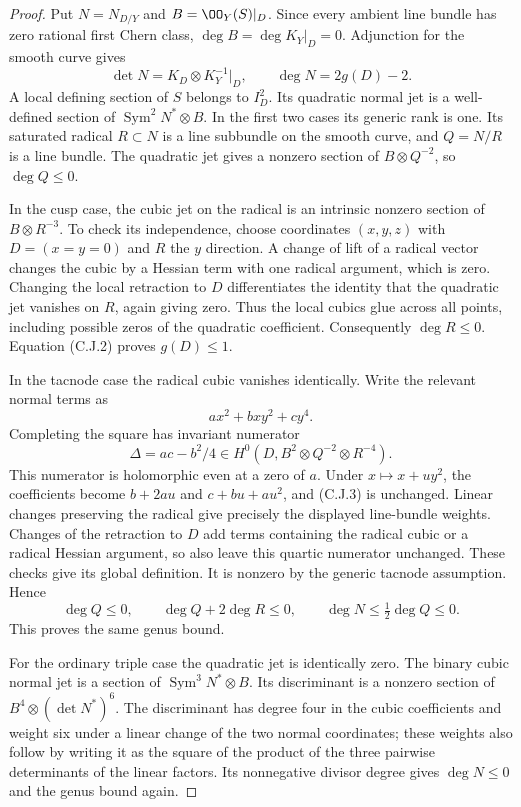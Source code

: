 \begin{proof}
Put $N=N_{D/Y}$ and $B=\OO_Y(S)|_D$. Since every ambient line bundle has zero rational first Chern class, $\deg B=\deg K_Y|_D=0$. Adjunction for the smooth curve gives
\[
 \det N=K_D\otimes K_Y^{-1}|_D,\qquad
 \deg N=2g(D)-2.                                      \tag{C.J.2}
\]
A local defining section of $S$ belongs to $I_D^2$. Its quadratic normal jet is a well-defined section of $\operatorname{Sym}^2N^*\otimes B$. In the first two cases its generic rank is one. Its saturated radical $R\subset N$ is a line subbundle on the smooth curve, and $Q=N/R$ is a line bundle. The quadratic jet gives a nonzero section of $B\otimes Q^{-2}$, so
$\deg Q\le0$.

In the cusp case, the cubic jet on the radical is an intrinsic nonzero section of $B\otimes R^{-3}$. To check its independence, choose coordinates $(x,y,z)$ with $D=(x=y=0)$ and $R$ the $y$ direction. A change of lift of a radical vector changes the cubic by a Hessian term with one radical argument, which is zero. Changing the local retraction to $D$ differentiates the identity that the quadratic jet vanishes on $R$, again giving zero. Thus the local cubics glue across all points, including possible zeros of the quadratic coefficient. Consequently $\deg R\le0$. Equation (C.J.2) proves $g(D)\le1$.

In the tacnode case the radical cubic vanishes identically. Write the relevant normal terms as
\[
 a x^2+bxy^2+cy^4.
\]
Completing the square has invariant numerator
\[
 \Delta=ac-b^2/4\in
 H^0(D,B^2\otimes Q^{-2}\otimes R^{-4}).               \tag{C.J.3}
\]
This numerator is holomorphic even at a zero of $a$. Under $x\mapsto x+uy^2$, the coefficients become $b+2au$ and $c+bu+au^2$, and (C.J.3) is unchanged. Linear changes preserving the radical give precisely the displayed line-bundle weights. Changes of the retraction to $D$ add terms containing the radical cubic or a radical Hessian argument, so also leave this quartic numerator unchanged. These checks give its global definition. It is nonzero by the generic tacnode assumption. Hence
\[
 \deg Q\le0,\qquad \deg Q+2\deg R\le0,
 \qquad \deg N\le\tfrac12\deg Q\le0.
\]
This proves the same genus bound.

For the ordinary triple case the quadratic jet is identically zero. The binary cubic normal jet is a section of $\operatorname{Sym}^3N^*\otimes B$. Its discriminant is a nonzero section of
$B^4\otimes(\det N^*)^6$. The discriminant has degree four in the cubic coefficients and weight six under a linear change of the two normal coordinates; these weights also follow by writing it as the square of the product of the three pairwise determinants of the linear factors. Its nonnegative divisor degree gives $\deg N\le0$ and the genus bound again.


\end{proof}
